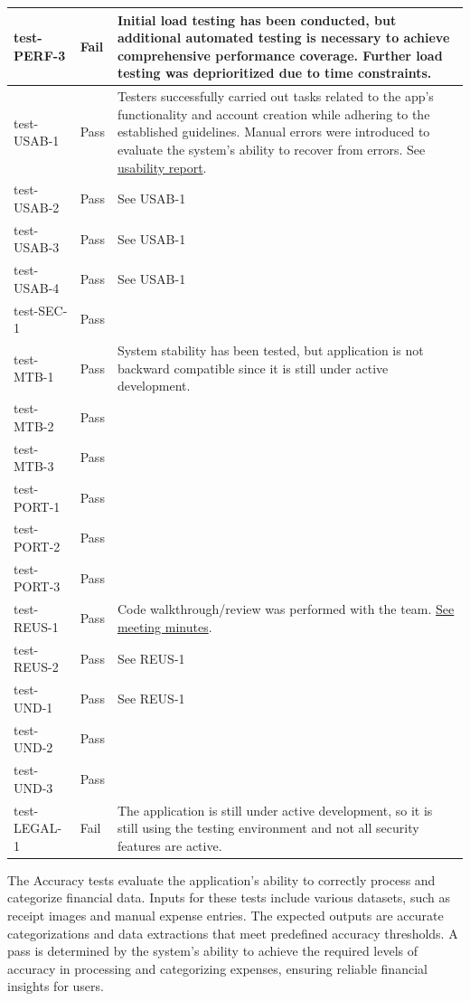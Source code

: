 \documentclass[12pt, titlepage]{article}
\begin{document}
\begin{longtable}{>{\centering\arraybackslash}p{} >{\centering\arraybackslash}p{} >{\centering\arraybackslash}p{}}
    test-PERF-3 & Fail & Initial load testing has been conducted, but additional 
    automated testing is necessary to achieve comprehensive performance coverage. Further load testing
    was deprioritized due to time constraints.\\
    \midrule
    test-USAB-1 & Pass & Testers successfully carried out tasks related to the
    app's functionality and account creation while adhering to the established
    guidelines. Manual errors were introduced to evaluate the system's ability
    to recover from errors. See \hyperref[sec:usability-report]{usability report}. \\
    test-USAB-2 & Pass & See USAB-1 \\
    test-USAB-3 & Pass & See USAB-1 \\
    test-USAB-4 & Pass & See USAB-1 \\
    \midrule
    test-SEC-1 & Pass &  \\
    \midrule
    test-MTB-1 & Pass & System stability has been tested, but application is not
    backward compatible since it is still under active development. \\
    test-MTB-2 & Pass &  \\
    test-MTB-3 & Pass &  \\
    \midrule
    test-PORT-1 & Pass &  \\
    test-PORT-2 & Pass &  \\
    test-PORT-3 & Pass &  \\
    \midrule
    test-REUS-1 & Pass & Code walkthrough/review was performed with the team.
    \href{https://github.com/PlutosCapstone/Plutos/issues/256}{See meeting
    minutes}. \\
    test-REUS-2 & Pass & See REUS-1 \\
    \midrule
    test-UND-1 & Pass & See REUS-1 \\
    test-UND-2 & Pass &  \\
    test-UND-3 & Pass &  \\
    \midrule
    test-LEGAL-1 & Fail & The application is still under active development, so
    it is still using the testing environment and not all security features are
    active. \\
    \bottomrule
\end{longtable}

The Accuracy tests evaluate the application's ability to correctly process and categorize 
financial data. Inputs for these tests include various datasets, such as receipt images 
and manual expense entries. The expected outputs are accurate categorizations and data 
extractions that meet predefined accuracy thresholds. A pass is determined by the 
system's ability to achieve the required levels of accuracy in processing and 
categorizing expenses, ensuring reliable financial insights for users.
\end{document}
